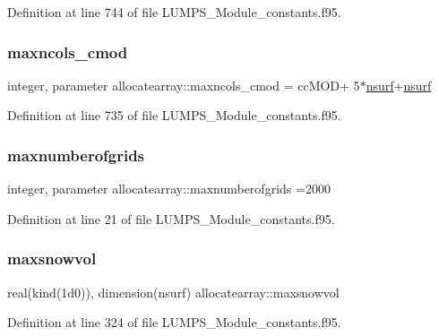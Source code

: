 Definition at line 744 of file L\+U\+M\+P\+S\+\_\+\+Module\+\_\+constants.\+f95.

\mbox{\label{namespaceallocatearray_a1f140f40b2405f3685b595a167d59b2e}} 
\subsubsection{\texorpdfstring{maxncols\+\_\+cmod}{maxncols\_cmod}}
{\footnotesize\ttfamily integer, parameter allocatearray\+::maxncols\+\_\+cmod = cc\+M\+OD+ 5$\ast$\hyperlink{namespaceallocatearray_acd22f92a06f7e9a2a91426b3dc99fdb0}{nsurf}+\hyperlink{namespaceallocatearray_acd22f92a06f7e9a2a91426b3dc99fdb0}{nsurf}}



Definition at line 735 of file L\+U\+M\+P\+S\+\_\+\+Module\+\_\+constants.\+f95.

\mbox{\label{namespaceallocatearray_a45073e6d9fc2dcbf2ca53fceaec41888}} 
\subsubsection{\texorpdfstring{maxnumberofgrids}{maxnumberofgrids}}
{\footnotesize\ttfamily integer, parameter allocatearray\+::maxnumberofgrids =2000}



Definition at line 21 of file L\+U\+M\+P\+S\+\_\+\+Module\+\_\+constants.\+f95.

\mbox{\label{namespaceallocatearray_aec874041558b5b832c4ebefb21848bef}} 
\subsubsection{\texorpdfstring{maxsnowvol}{maxsnowvol}}
{\footnotesize\ttfamily real(kind(1d0)), dimension(nsurf) allocatearray\+::maxsnowvol}



Definition at line 324 of file L\+U\+M\+P\+S\+\_\+\+Module\+\_\+constants.\+f95.

